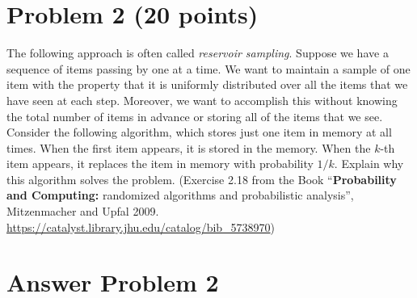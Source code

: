 \documentclass[letterpaper, 11pt]{article}
\begin{document}
\newpage
\section*{Problem 2 (20 points)}
The following approach is often called \textit{reservoir sampling}. Suppose we have a sequence of items passing by one at a time. We want to maintain a sample of one item with the property that it is uniformly distributed over all the items that we have seen at each step. Moreover, we want to accomplish this without knowing the total number of items in advance or storing all of the items that we see.
Consider the following algorithm, which stores just one item in memory at all times. When the first item appears, it is stored in the memory. When the $k$-th item appears, it replaces the item in memory with probability $1/k$. Explain why this algorithm solves the problem. (Exercise 2.18 from the Book ``\textbf{Probability and Computing:} randomized algorithms and probabilistic analysis'', Mitzenmacher and Upfal 2009.\\
\url{https://catalyst.library.jhu.edu/catalog/bib_5738970})
\newpage
\section*{Answer Problem 2}
\end{document}
